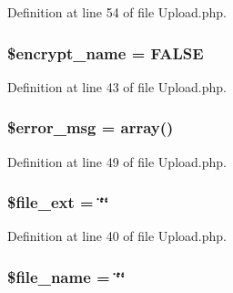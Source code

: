 Definition at line 54 of file Upload.\+php.

\subsubsection[{\texorpdfstring{\$encrypt\+\_\+name}{$encrypt_name}}]{\setlength{\rightskip}{0pt plus 5cm}\$encrypt\+\_\+name = F\+A\+L\+SE}\hypertarget{class_c_i___upload_a54a751add0762edd4da11373e3b56687}{}\label{class_c_i___upload_a54a751add0762edd4da11373e3b56687}


Definition at line 43 of file Upload.\+php.

\subsubsection[{\texorpdfstring{\$error\+\_\+msg}{$error_msg}}]{\setlength{\rightskip}{0pt plus 5cm}\$error\+\_\+msg = array()}\hypertarget{class_c_i___upload_acf910733622c1fa671b9f755c69c2ec7}{}\label{class_c_i___upload_acf910733622c1fa671b9f755c69c2ec7}


Definition at line 49 of file Upload.\+php.

\subsubsection[{\texorpdfstring{\$file\+\_\+ext}{$file_ext}}]{\setlength{\rightskip}{0pt plus 5cm}\$file\+\_\+ext = \char`\"{}\char`\"{}}\hypertarget{class_c_i___upload_a65b080519869bc14d792c1800e3362f5}{}\label{class_c_i___upload_a65b080519869bc14d792c1800e3362f5}


Definition at line 40 of file Upload.\+php.

\subsubsection[{\texorpdfstring{\$file\+\_\+name}{$file_name}}]{\setlength{\rightskip}{0pt plus 5cm}\$file\+\_\+name = \char`\"{}\char`\"{}}\hypertarget{class_c_i___upload_a59bf132c77b5bee5adff2098cc2a6fbc}{}\label{class_c_i___upload_a59bf132c77b5bee5adff2098cc2a6fbc}


